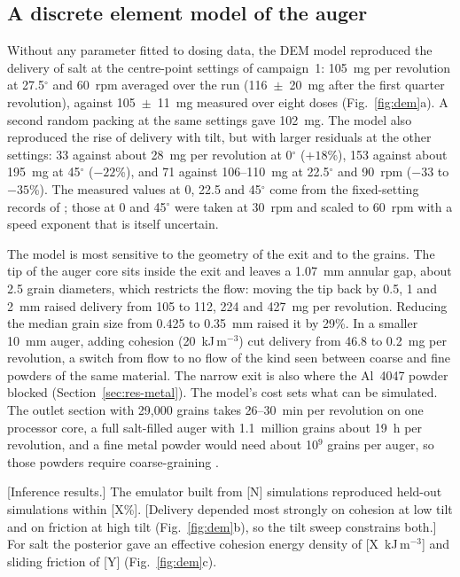 \documentclass[preprint,12pt]{elsarticle}
\newcommand{\ph}[1]{\textcolor{orange!75!black}{\textsf{[#1]}}}
\begin{document}
\subsection{A discrete element model of the auger}
\label{sec:res-dem}

Without any parameter fitted to dosing data, the DEM model reproduced the delivery of salt at the centre-point settings of campaign~1: 105~mg per revolution at 27.5$^\circ$ and 60~rpm averaged over the run (116~$\pm$~20~mg after the first quarter revolution), against 105~$\pm$~11~mg measured over eight doses (Fig.~\ref{fig:dem}a). A second random packing at the same settings gave 102~mg. The model also reproduced the rise of delivery with tilt, but with larger residuals at the other settings: 33 against about 28~mg per revolution at 0$^\circ$ ($+18$\%), 153 against about 195~mg at 45$^\circ$ ($-22$\%), and 71 against 106--110~mg at 22.5$^\circ$ and 90~rpm ($-33$ to $-35$\%). The measured values at 0, 22.5 and 45$^\circ$ come from the fixed-setting records of \cite{Charles2026Open}; those at 0 and 45$^\circ$ were taken at 30~rpm and scaled to 60~rpm with a speed exponent that is itself uncertain.

The model is most sensitive to the geometry of the exit and to the grains. The tip of the auger core sits inside the exit and leaves a 1.07~mm annular gap, about 2.5 grain diameters, which restricts the flow: moving the tip back by 0.5, 1 and 2~mm raised delivery from 105 to 112, 224 and 427~mg per revolution. Reducing the median grain size from 0.425 to 0.35~mm raised it by 29\%. In a smaller 10~mm auger, adding cohesion (20~kJ\,m$^{-3}$) cut delivery from 46.8 to 0.2~mg per revolution, a switch from flow to no flow of the kind seen between coarse and fine powders of the same material. The narrow exit is also where the Al~4047 powder blocked (Section~\ref{sec:res-metal}). The model's cost sets what can be simulated. The outlet section with 29{,}000 grains takes 26--30~min per revolution on one processor core, a full salt-filled auger with 1.1~million grains about 19~h per revolution, and a fine metal powder would need about 10$^9$ grains per auger, so those powders require coarse-graining \cite{Girnth2024Dimensionless}.

\ph{Inference results.} The emulator built from \ph{N} simulations reproduced held-out simulations within \ph{X\%}. \ph{Delivery depended most strongly on cohesion at low tilt and on friction at high tilt (Fig.~\ref{fig:dem}b), so the tilt sweep constrains both.} For salt the posterior gave an effective cohesion energy density of \ph{X~kJ\,m$^{-3}$} and sliding friction of \ph{Y} (Fig.~\ref{fig:dem}c).
\end{document}

